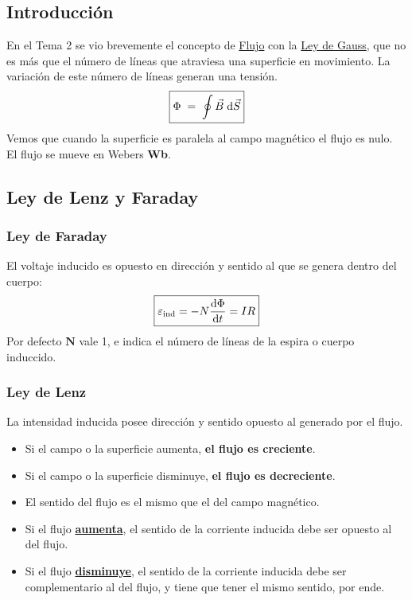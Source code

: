 \subsection{Introducción}
\noindent En el Tema 2 se vio brevemente el concepto de \underline{Flujo} con la \underline{Ley de Gauss}, que no es más que el número de líneas que atraviesa una superficie en movimiento. La variación de este número de líneas generan una tensión.
\[
        \boxed{\Phi \hspace{1mm}=\hspace{1mm} \oint \vec{B}\hspace{1mm}\mathrm{d}\vec{S}}
\]
\noindent Vemos que cuando la superficie es paralela al campo magnético el flujo es nulo.\\
\noindent El flujo se mueve en Webers \textbf{Wb}.
\subsection{Ley de Lenz y Faraday}
\subsubsection{Ley de Faraday}
\noindent El voltaje inducido es opuesto en dirección y sentido al que se genera dentro del cuerpo:
\[
        \boxed{\mathbf{\varepsilon_{\textnormal{ind}}} = -N\frac{\mathrm{d}\Phi}{\mathrm{d}t} = IR}
\]
\noindent Por defecto \(\mathbf{N}\) vale 1, e indica el número de líneas de la espira o cuerpo induccido.
\subsubsection{Ley de Lenz}
La intensidad inducida posee dirección y sentido opuesto al generado por el flujo.
\begin{itemize}
        \item Si el campo o la superficie aumenta, \textbf{el flujo es creciente}.
        \item Si el campo o la superficie disminuye, \textbf{el flujo es decreciente}.
        \item El sentido del flujo es el mismo que el del campo magnético.
        \item Si el flujo \underline{\textbf{aumenta}}, el sentido de la corriente inducida debe ser opuesto al del flujo.
        \item Si el flujo \underline{\textbf{disminuye}}, el sentido de la corriente inducida debe ser complementario al del flujo, y tiene que tener el mismo sentido, por ende.
\end{itemize}
